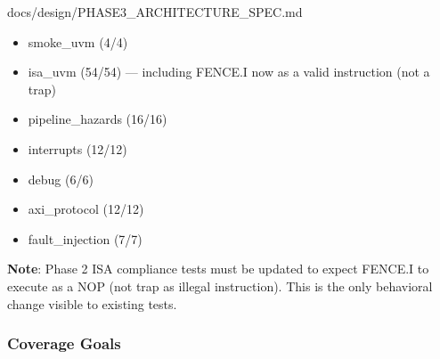 \begin{relocated}{docs/design/PHASE3_ARCHITECTURE_SPEC.md}
\begin{itemize}
\tightlist
\item
  smoke\_uvm (4/4)
\item
  isa\_uvm (54/54) --- including FENCE.I now as a valid instruction (not
  a trap)
\item
  pipeline\_\allowbreak{}hazards (16/16)
\item
  interrupts (12/12)
\item
  debug (6/6)
\item
  axi\_\allowbreak{}protocol (12/12)
\item
  fault\_\allowbreak{}injection (7/7)
\end{itemize}

\textbf{Note}: Phase 2 ISA compliance tests must be updated to expect
FENCE.I to execute as a NOP (not trap as illegal instruction). This is
the only behavioral change visible to existing tests.

\subsubsection{Coverage Goals}\label{ds:ch:phase3-architecture:93-coverage-goals}


\end{relocated}
